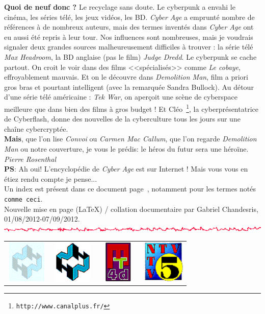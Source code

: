 \documentclass[11pt,twoside,a4paper]{article}
\def\imgCANHfond{\includegraphics[width=2.00cm,height=2.00cm]{img/fondhn.png} }
\def\imgCANHlogo{\includegraphics[width=2.00cm,height=2.00cm]{img/logohn.png} }
\def\imgCAMatrixTools{\includegraphics[width=2.00cm,height=2.00cm]{img/logomt4d.png} }
\def\imgCANTV555{\includegraphics[width=2.00cm,height=2.00cm]{img/logontv5.png} }
\def\barreCyberAge{\includegraphics[width=\textwidth]{img/Filet_CA.png}}
\begin{document}
\textbf{Quoi de neuf donc ?} Le recyclage sans doute. Le cyberpunk a envahi le cin{\'e}ma, les s{\'e}ries t{\'e}l{\'e}, les jeux vid{\'e}os, les BD. \emph{Cyber Age} a emprunt{\'e} nombre de r{\'e}f{\'e}rences {\`a} de nombreux auteurs, mais des termes invent{\'e}s dans \emph{Cyber Age} ont eu aussi {\'e}t{\'e} repris {\`a} leur tour. Nos influences sont nombreuses, mais je voudrais signaler deux grandes sources malheureusement difficiles {\`a} trouver : la s{\'e}rie t{\'e}l{\'e} \emph{Max Headroom}, la BD anglaise (pas le film) \emph{Judge Dredd}. Le cyberpunk se cache partout. On croit le voir dans des films <<sp{\'e}cialis{\'e}s>> comme \emph{Le cobaye}, effroyablement mauvais. Et on le d{\'e}couvre dans \emph{Demolition Man}, film a priori gros bras et pourtant intelligent (avec la remarqu{\'e}e Sandra Bullock). Au d{\'e}tour d'une s{\'e}rie t{\'e}l{\'e} am{\'e}ricaine : \emph{Tek War}, on aper\c{c}oit une sc{\`e}ne de cyberspace meilleure que dans bien des films {\`a} gros budget ! Et Cl{\'e}o~\footnote{\texttt{http://www.canalplus.fr/}}, la cyberpr{\'e}sentatrice de Cyberflash, donne des nouvelles de la cyberculture tous les jours sur une cha{\^i}ne cybercrypt{\'e}e.~\\

\textbf{Mais}, que l'on lise \emph{Convoi\texttrademark} ou \emph{Carmen Mac Callum}, que l'on regarde \emph{Demolition Man} ou notre couverture, je vous le pr{\'e}dis: le h{\'e}ros du futur sera une h{\'e}ro{\"i}ne.~\\

\emph{Pierre Rosenthal}~\\

\textbf{PS}: Ah oui! L'encyclop{\'e}die de \emph{Cyber Age} est sur Internet ! Mais vous vous en {\'e}tiez rendu compte je pense... ~\\

Un index est pr{\'e}sent dans ce document page~\pageref{index}, notamment pour les termes not{\'e}s \texttt{comme ceci}. ~\\

Nouvelle mise en page (\LaTeX) / collation documentaire par Gabriel Chandesris, 01/08/2012-07/09/2012. ~\\

\barreCyberAge

\begin{center}
	\begin{tabular}[ht]{ c c c c }
		\imgCANHfond	&	\imgCANHlogo	&	\imgCAMatrixTools	&	\imgCANTV555	\\
	\end{tabular}
\end{center}
\end{document}
